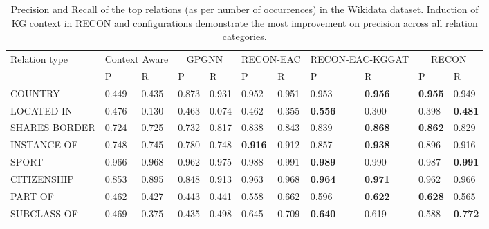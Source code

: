\documentclass[sigconf]{acmart}
\begin{document}
\begin{table*}[!htb]
    \centering
    \begin{tabular}{p{2.5cm}|p{0.8cm}p{0.8cm}|p{0.8cm}p{0.8cm}|p{1.0cm}p{1.0cm}|p{1.2cm}p{1.2cm}|p{0.8cm}p{0.8cm}}
\toprule
Relation type & \multicolumn{2}{c|}{Context Aware}& \multicolumn{2}{c|}{GPGNN} & \multicolumn{2}{c|}{RECON-EAC} & \multicolumn{2}{c|}{RECON-EAC-KGGAT} & \multicolumn{2}{c}{RECON} \\
         & P & R & P & R& P & R & P & R & P & R \\
\midrule
        COUNTRY & 0.449 & 0.435 & 0.873& 0.931& 0.952& 0.951& 0.953& \textbf{0.956}& \textbf{0.955}& 0.949  \\
        LOCATED IN & 0.476& 0.130& 0.463& 0.074& 0.462& 0.355& \textbf{0.556}& 0.300& 0.398& \textbf{0.481}  \\
        SHARES BORDER & 0.724& 0.725& 0.732& 0.817& 0.838& 0.843& 0.839& \textbf{0.868}& \textbf{0.862}& 0.829   \\ 
        INSTANCE OF & 0.748& 0.745& 0.780& 0.748& \textbf{0.916}& 0.912& 0.857& \textbf{0.938}& 0.896& 0.916   \\
        SPORT & 0.966& 0.968& 0.962& 0.975& 0.988& 0.991& \textbf{0.989}& 0.990& 0.987& \textbf{0.991}  \\
        CITIZENSHIP & 0.853& 0.895& 0.848& 0.913& 0.963& 0.968& \textbf{0.964}& \textbf{0.971}& 0.962& 0.966  \\
        PART OF & 0.462& 0.427& 0.443& 0.441& 0.558& 0.662& 0.596& \textbf{0.622}& \textbf{0.628}& 0.565  \\
        SUBCLASS OF & 0.469& 0.375& 0.435& 0.498& 0.645& 0.709& \textbf{0.640}& 0.619& 0.588& \textbf{0.772}  \\
        \bottomrule
    \end{tabular}
    \caption{Precision and Recall of the top relations (as per number of occurrences) in the Wikidata dataset. Induction of KG context in RECON and configurations demonstrate the most improvement on precision across all relation categories.}
    \label{tab:tab-toprelation}
        \vspace{-2mm}
\end{table*} 
\end{document}
